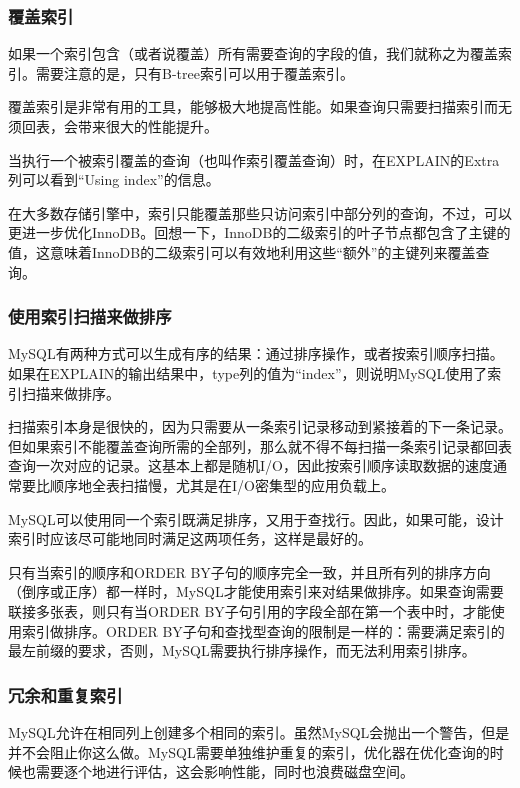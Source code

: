 \subsubsection{覆盖索引}

如果一个索引包含（或者说覆盖）所有需要查询的字段的值，我们就称之为覆盖索引。需要注意的是，只有B-tree索引可以用于覆盖索引。

覆盖索引是非常有用的工具，能够极大地提高性能。如果查询只需要扫描索引而无须回表，会带来很大的性能提升。

当执行一个被索引覆盖的查询（也叫作索引覆盖查询）时，在EXPLAIN的Extra列可以看到“Using index”的信息。

在大多数存储引擎中，索引只能覆盖那些只访问索引中部分列的查询，不过，可以更进一步优化InnoDB。回想一下，InnoDB的二级索引的叶子节点都包含了主键的值，这意味着InnoDB的二级索引可以有效地利用这些“额外”的主键列来覆盖查询。

\subsubsection{使用索引扫描来做排序}

MySQL有两种方式可以生成有序的结果：通过排序操作，或者按索引顺序扫描。如果在EXPLAIN的输出结果中，type列的值为“index”，则说明MySQL使用了索引扫描来做排序。

扫描索引本身是很快的，因为只需要从一条索引记录移动到紧接着的下一条记录。但如果索引不能覆盖查询所需的全部列，那么就不得不每扫描一条索引记录都回表查询一次对应的记录。这基本上都是随机I/O，因此按索引顺序读取数据的速度通常要比顺序地全表扫描慢，尤其是在I/O密集型的应用负载上。

MySQL可以使用同一个索引既满足排序，又用于查找行。因此，如果可能，设计索引时应该尽可能地同时满足这两项任务，这样是最好的。

只有当索引的顺序和ORDER BY子句的顺序完全一致，并且所有列的排序方向（倒序或正序）都一样时，MySQL才能使用索引来对结果做排序。如果查询需要联接多张表，则只有当ORDER BY子句引用的字段全部在第一个表中时，才能使用索引做排序。ORDER BY子句和查找型查询的限制是一样的：需要满足索引的最左前缀的要求，否则，MySQL需要执行排序操作，而无法利用索引排序。

\subsubsection{冗余和重复索引}

MySQL允许在相同列上创建多个相同的索引。虽然MySQL会抛出一个警告，但是并不会阻止你这么做。MySQL需要单独维护重复的索引，优化器在优化查询的时候也需要逐个地进行评估，这会影响性能，同时也浪费磁盘空间。

